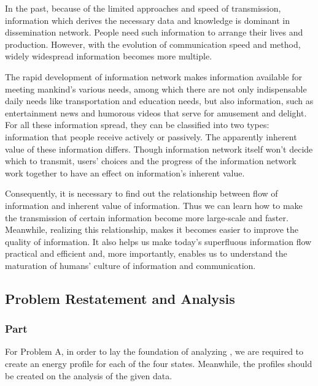 \documentclass[a4paper,11pt]{article}
\begin{document}
\par In the past, because of the limited approaches and speed of transmission, information which derives the necessary data and knowledge is dominant in dissemination network. People need such information to arrange their lives and production. However, with the evolution of communication speed and method, widely widespread information becomes more multiple.
\par The rapid development of information network makes information available for meeting mankind's various needs, among which there are not  only indispensable daily needs like transportation and education needs, but also information, such as entertainment news and humorous videos that serve for amusement and delight. For all these information spread, they can be classified into two types: information that people receive actively or passively. The apparently inherent value of these information differs. Though information network itself won't decide which to transmit, users' choices and the progress of the information network work together to have an effect on information's inherent value.
\par Consequently, it is necessary to find out the relationship between flow of information and inherent value of information. Thus we can learn how to make the transmission of certain information become more large-scale and faster. Meanwhile, realizing this relationship, makes it becomes easier to improve the quality of information. It also helps us make today's superfluous information flow practical and efficient and, more importantly, enables us to understand the maturation of humans' culture of information and communication.






\subsection{Problem Restatement and Analysis}
\subsubsection{Part \uppercase\expandafter{}}
\par For Problem A, in order to lay the foundation of analyzing , we are required to create an energy profile for each of the four states. Meanwhile, the profiles should be created on the analysis of the given data.
\end{document}
